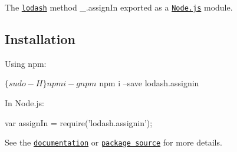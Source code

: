 The \href{https://lodash.com/}{\tt lodash} method {\ttfamily \+\_\+.\+assign\+In} exported as a \href{https://nodejs.org/}{\tt Node.\+js} module.

\subsection*{Installation}

Using npm\+: 
\begin{DoxyCode}
$ \{sudo -H\} npm i -g npm
$ npm i --save lodash.assignin
\end{DoxyCode}


In Node.\+js\+: 
\begin{DoxyCode}
var assignIn = require('lodash.assignin');
\end{DoxyCode}


See the \href{https://lodash.com/docs#assignIn}{\tt documentation} or \href{https://github.com/lodash/lodash/blob/4.2.0-npm-packages/lodash.assignin}{\tt package source} for more details. 